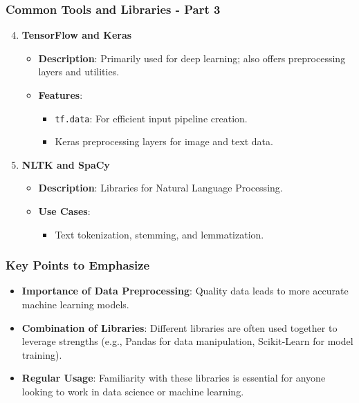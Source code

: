 \documentclass{beamer}
\begin{document}
\begin{frame}
    \frametitle{Common Tools and Libraries - Part 3}
    \begin{enumerate}
        \setcounter{enumi}{3}
        \item \textbf{TensorFlow and Keras}
            \begin{itemize}
                \item \textbf{Description}: Primarily used for deep learning; also offers preprocessing layers and utilities.
                \item \textbf{Features}:
                    \begin{itemize}
                        \item \texttt{tf.data}: For efficient input pipeline creation.
                        \item Keras preprocessing layers for image and text data.
                    \end{itemize}
            \end{itemize}

        \item \textbf{NLTK and SpaCy}
            \begin{itemize}
                \item \textbf{Description}: Libraries for Natural Language Processing.
                \item \textbf{Use Cases}: 
                    \begin{itemize}
                        \item Text tokenization, stemming, and lemmatization.
                    \end{itemize}
            \end{itemize}
    \end{enumerate}
\end{frame}

\begin{frame}
    \frametitle{Key Points to Emphasize}
    \begin{itemize}
        \item \textbf{Importance of Data Preprocessing}: Quality data leads to more accurate machine learning models.
        \item \textbf{Combination of Libraries}: Different libraries are often used together to leverage strengths (e.g., Pandas for data manipulation, Scikit-Learn for model training).
        \item \textbf{Regular Usage}: Familiarity with these libraries is essential for anyone looking to work in data science or machine learning.
    \end{itemize}
\end{frame}
\end{document}
